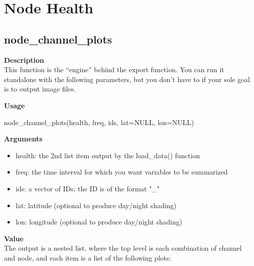 \documentclass[
]{book}
\newenvironment{Shaded}{\begin{snugshade}}{\end{snugshade}}
\newcommand{\AttributeTok}[1]{\textcolor[rgb]{0.77,0.63,0.00}{#1}}
\newcommand{\ConstantTok}[1]{\textcolor[rgb]{0.00,0.00,0.00}{#1}}
\newcommand{\FunctionTok}[1]{\textcolor[rgb]{0.00,0.00,0.00}{#1}}
\newcommand{\NormalTok}[1]{#1}
\providecommand{\tightlist}{%
  \setlength{\itemsep}{0pt}\setlength{\parskip}{0pt}}
\begin{document}
\hypertarget{node-health}{%
\section{Node Health}\label{node-health}}

\hypertarget{node_channel_plots}{%
\subsection{node\_channel\_plots}\label{node_channel_plots}}

\textbf{Description}\\
This function is the ``engine'' behind the export function. You can run it standalone with the following parameters, but you don't have to if your sole goal is to output image files.

\textbf{Usage}

\begin{Shaded}
\begin{Highlighting}[]
\FunctionTok{node\_channel\_plots}\NormalTok{(health, freq, ids, }\AttributeTok{lat=}\ConstantTok{NULL}\NormalTok{, }\AttributeTok{lon=}\ConstantTok{NULL}\NormalTok{)  }
\end{Highlighting}
\end{Shaded}

\textbf{Arguments}

\begin{itemize}
\tightlist
\item
  health: the 2nd list item output by the load\_data() function\\
\item
  freq: the time interval for which you want variables to be summarized\\
\item
  ids: a vector of IDs; the ID is of the format "\_"\\
\item
  lat: latitude (optional to produce day/night shading)
\item
  lon: longitude (optional to produce day/night shading)
\end{itemize}

\textbf{Value}\\
The output is a nested list, where the top level is each combination of channel and node, and each item is a list of the following plots:
\end{document}
